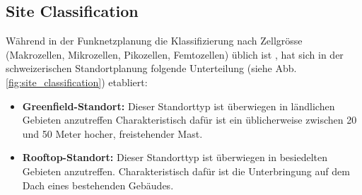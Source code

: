 \subsection{Site Classification}
\begin{German}
    Während in der Funknetzplanung die Klassifizierung nach Zellgrösse (Makrozellen, Mikrozellen, Pikozellen, Femtozellen) üblich ist \cite{jiangCellularCommunicationNetworks2024}, hat sich in der schweizerischen Standortplanung folgende Unterteilung (siehe Abb. \ref{fig:site_classification}) etabliert: 

    \begin{itemize}
        \item \textbf{Greenfield-Standort:} Dieser Standorttyp ist überwiegen in ländlichen Gebieten anzutreffen Charakteristisch dafür ist ein üblicherweise zwischen 20 und 50 Meter hocher, freistehender Mast.
        \item \textbf{Rooftop-Standort:} Dieser Standorttyp ist überwiegen in besiedelten Gebieten anzutreffen. Charakteristisch dafür ist die Unterbringung auf dem Dach eines bestehenden Gebäudes.
    \end{itemize}
\end{German}

